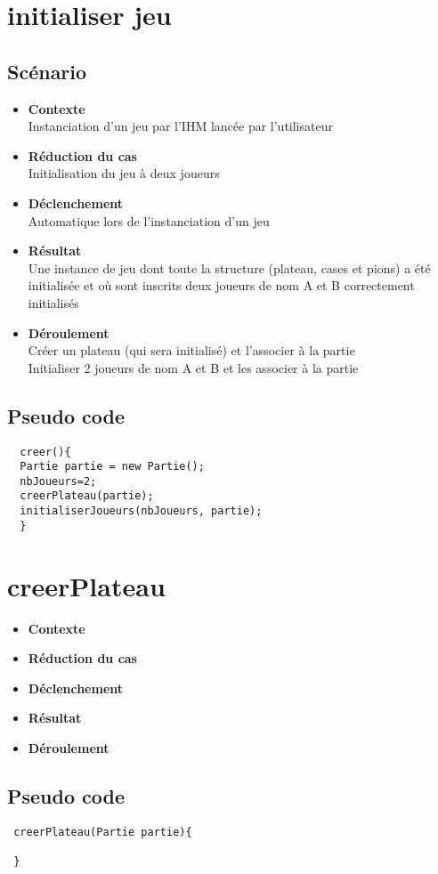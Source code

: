 \documentclass[a4paper, 12pt]{article}
\begin{document}
 

%
%

%
%

\section{initialiser jeu}
 \subsection{Scénario}
 
 \begin{itemize}
  \item \textbf{Contexte} \\
  Instanciation d'un jeu par l'IHM lancée par l'utilisateur
  \item \textbf{Réduction du cas}\\
  Initialisation du jeu à deux joueurs
  \item \textbf{Déclenchement}\\
  Automatique lors de l'instanciation d'un jeu
  \item \textbf{Résultat}\\
  Une instance de jeu dont toute la structure (plateau, cases et pions) a été initialisée et où sont inscrits deux joueurs de nom A et B correctement initialisés  
  \item \textbf{Déroulement}\\
  Créer un plateau (qui sera initialisé) et l'associer à la partie\\
  Initialiser 2 joueurs de nom A et B et les associer à la partie\\
 \end{itemize}

 \subsection{Pseudo code}
 \begin{lstlisting}    
  creer(){
  Partie partie = new Partie();
  nbJoueurs=2;
  creerPlateau(partie);
  initialiserJoueurs(nbJoueurs, partie);
  }
 \end{lstlisting}

 \section{creerPlateau}
  \begin{itemize}
  \item \textbf{Contexte} \\
  \item \textbf{Réduction du cas}\\
  \item \textbf{Déclenchement}\\
  \item \textbf{Résultat}\\
  \item \textbf{Déroulement}\\
 \end{itemize}

 \subsection{Pseudo code}
 \begin{lstlisting}    
 creerPlateau(Partie partie){
 
 }
 \end{lstlisting}
\end{document}

